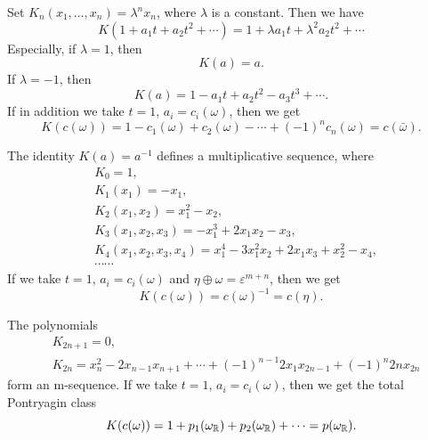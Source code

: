 \begin{example}\label{ex:m-sequence1}
    Set $K_n(x_1,\dots,x_n) = \lambda^n x_n$, where $\lambda$ is a constant. Then we have
    \begin{equation*}
        K(1+a_1t+a_2t^2+\cdots) = 1 + \lambda a_1 t + \lambda^2 a_2 t^2 + \cdots 
    \end{equation*}
    Especially, if $\lambda = 1$, then 
    \begin{equation*}
        K(a) = a.
    \end{equation*}
    If $\lambda = -1$, then 
    \begin{equation*}
        K(a) = 1 - a_1t + a_2t^2 - a_3t^3 + \cdots. 
    \end{equation*}
    If in addition we take $t=1$, $a_i = c_i(\omega)$, then we get
    \begin{equation*}
        K(c(\omega)) = 1 - c_1(\omega) + c_2(\omega) - \cdots + (-1)^n c_n(\omega) = c(\bar{\omega}).
    \end{equation*}
\end{example}
\begin{example}\label{ex:m-sequence2}
    The identity $K(a) = a^{-1}$ defines a multiplicative sequence, where
    \begin{align*}
        &K_0 = 1, \\
        &K_1(x_1) = -x_1, \\
        &K_2(x_1,x_2) = x_1^2 - x_2, \\
        &K_3(x_1,x_2,x_3) = -x_1^3 + 2x_1x_2 - x_3, \\
        &K_4(x_1,x_2,x_3,x_4) = x_1^4 - 3x_1^2x_2 + 2x_1x_3 + x_2^2 - x_4, \\
        &\cdots\cdots
    \end{align*}
    If we take $t=1$, $a_i = c_i(\omega)$ and $\eta\oplus\omega = \varepsilon^{m+n}$, then we get
    \begin{equation*}
        K(c(\omega)) = c(\omega)^{-1} = c(\eta).
    \end{equation*}
\end{example}
\begin{example}\label{ex:m-sequence3}
    The polynomials 
    \begin{align*}
        &K_{2n+1} = 0, \\
        &K_{2n} = x_n^2 - 2x_{n-1}x_{n+1} + \cdots + (-1)^{n-1}2x_1 x_{2n-1} + (-1)^n 2n x_{2n}
    \end{align*}
    form an m-sequence. If we take $t=1$, $a_i = c_i(\omega)$, then we get the total Pontryagin class
    \begin{equation*}
        K(c(\omega)) = 1 + p_1(\omega_{\mathbb{R}}) + p_2(\omega_{\mathbb{R}}) + \cdots = p(\omega_{\mathbb{R}}).
    \end{equation*}
\end{example}

